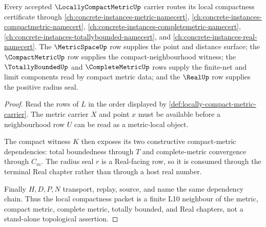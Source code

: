 \begin{theorem}
\label{thm:locally-compact-metric-sibling-dependency-route}
Every accepted $\LocallyCompactMetricUp$ carrier routes its local compactness certificate through \autoref{ch:concrete-instances-metric-namecert}, \autoref{ch:concrete-instances-compactmetric-namecert}, \autoref{ch:concrete-instances-completemetric-namecert}, \autoref{ch:concrete-instances-totallybounded-namecert}, and \autoref{ch:concrete-instances-real-namecert}. The $\MetricSpaceUp$ row supplies the point and distance surface; the $\CompactMetricUp$ row supplies the compact-neighbourhood witness; the $\TotallyBoundedUp$ and $\CompleteMetricUp$ rows supply the finite-net and limit components read by compact metric data; and the $\RealUp$ row supplies the positive radius seal.
\end{theorem}
\begin{proof}
Read the rows of $L$ in the order displayed by \autoref{def:locally-compact-metric-carrier}. The metric carrier $X$ and point $x$ must be available before a neighbourhood row $U$ can be read as a metric-local object.

The compact witness $K$ then exposes its two constructive compact-metric dependencies: total boundedness through $T$ and complete-metric convergence through $C_m$. The radius seal $r$ is a Real-facing row, so it is consumed through the terminal Real chapter rather than through a host real number.

Finally $H,D,P,N$ transport, replay, source, and name the same dependency chain. Thus the local compactness packet is a finite L10 neighbour of the metric, compact metric, complete metric, totally bounded, and Real chapters, not a stand-alone topological assertion.
\end{proof}



